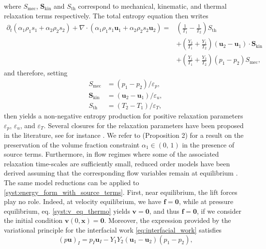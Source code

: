\documentclass{myclass}
\newcommand{\vel}{\bm{u}}
\newcommand{\lift}{\bm{f}}
\newcommand{\pth}[1]  {\left( #1 \right)}
\begin{document}
where $S_{\text{mec}}$, $\bm{S}_{\text{kin}}$ and $S_{\text{th}}$ correspond to mechanical, kinematic, and thermal relaxation terms respectively. The total entropy equation then writes
\begin{equation}
\begin{split}
\partial_t\pth{\alpha_1\rho_1 s_1 + \alpha_2 \rho_2 s_2} + \nabla\cdot\pth{\alpha_1\rho_1 s_1 \vel_1 + \alpha_2 \rho_2 s_2 \vel_2} =
 &\pth{\frac{1}{T_1}-\frac{1}{T_2}}S_{\text{th}} \\ & + \pth{\frac{Y_2}{T_1} + \frac{Y_1}{T_2}}(\vel_2-\vel_1)\cdot\bm{S}_{\text{kin}} \\ & + \pth{\frac{Y_1}{T_1} + \frac{Y_2}{T_2}}(p_1-p_2)S_{\text{mec}} ,
\end{split}\label{eq:entropy_balance}
\end{equation}
and therefore, setting
\begin{subequations}
\begin{align}
S_{\text{mec}} & = (p_1-p_2)/\varepsilon_p,\\
\bm{S}_{\text{kin}} & = (\vel_2-\vel_1)/\varepsilon_u ,\\
S_{\text{th}} & = (T_2 - T_1)/\varepsilon_T,
\end{align}
\end{subequations}
then yields a non-negative entropy production for positive relaxation parameters $\varepsilon_p$, $\varepsilon_u$, and $\varepsilon_T$. Several closures for the relaxation parameters have been proposed in the literature, see for instance \cite{petitpas:2009,perrier:2021,schmidmayer:2023,herard:2023}. We refer to \cite{gallouet:2004} (Proposition 2) for a result on the preservation of the volume fraction constraint $\alpha_1\in(0,\,1)$ in the presence of source terms. Furthermore, in flow regimes where some of the associated relaxation time-scales are sufficiently small, reduced order models have been derived assuming that the corresponding flow variables remain at equilibrium \cite{kapila:2001,phd_Labois,lund:2012,hantke:2021}. The same model reductions can be applied to \eqref{syst:energy_form_with_source_terms}. First, near equilibrium, the lift forces play no role. Indeed, at velocity equilibrium, we have $\lift=\bm{0}$, while at pressure equilibrium, eq. \eqref{syst:v_eq_thermo} yields $\bm{v}=\bm{0}$, and thus $\lift=\bm{0}$, if we consider the initial condition $\bm{v}(0,\bm{x})=\bm{0}$.  Moreover, the expression provided by the variational principle for the interfacial work \eqref{eq:interfacial_work}  satisfies
\begin{equation}
(p\vel)_I = p_I \vel_I - Y_1 Y_2(\vel_1 - \vel_2)(p_1-p_2),
\end{equation}
\end{document}
